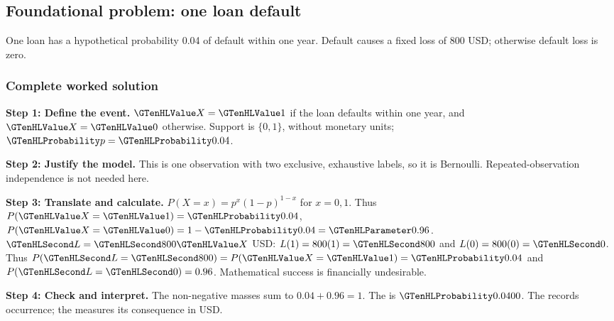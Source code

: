\clearpage
\subsection{Foundational problem: one loan default}\label{prob:c3-loan}
One loan has a hypothetical probability 0.04 of default within one year. Default causes a fixed loss of 800 USD; otherwise default loss is zero.


\subsubsection*{Complete worked solution}\label{sol:c3-loan}
\par\noindent\begin{minipage}{\linewidth}
\textbf{Step 1: Define the event.} $\Indicator{X}=\Indicator{1}$ if the loan defaults within one year, and $\Indicator{X}=\Indicator{0}$ otherwise. Support is $\{0,1\}$, without monetary units; $\SuccessProb{p}=\SuccessProb{0.04}$.
\end{minipage}\par\medskip
\par\noindent\begin{minipage}{\linewidth}
\textbf{Step 2: Justify the model.} This is one observation with two exclusive, exhaustive labels, so it is Bernoulli. Repeated-observation independence is not needed here.
\end{minipage}\par\medskip
\par\noindent\begin{minipage}{\linewidth}
\textbf{Step 3: Translate and calculate.} $P(X=x)=p^x(1-p)^{1-x}$ for $x=0,1$. Thus $P(\Indicator{X}=\Indicator{1})=\SuccessProb{0.04}$, $P(\Indicator{X}=\Indicator{0})=1-\SuccessProb{0.04}=\FailureProb{0.96}$. $\Money{L}=\Money{800}\Indicator{X}$ USD: $L(1)=800(1)=\Money{800}$ and $L(0)=800(0)=\Money{0}$. Thus $P(\Money{L}=\Money{800})=P(\Indicator{X}=\Indicator{1})=\SuccessProb{0.04}$ and $P(\Money{L}=\Money{0})=0.96$. Mathematical success is financially undesirable.
\end{minipage}\par\medskip
\par\noindent\begin{minipage}{\linewidth}
\textbf{Step 4: Check and interpret.} The non-negative masses sum to $ 0.04+0.96=1$. The  is $\SuccessProb{0.0400}$. The  records occurrence; the  measures its consequence in USD.
\end{minipage}\par\medskip

